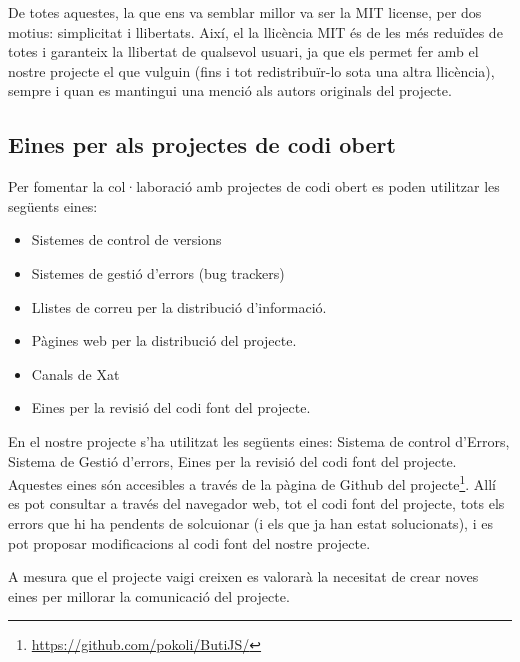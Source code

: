 De totes aquestes, la que ens va semblar millor va ser la MIT license, per dos motius: simplicitat i llibertats. Així, el la llicència MIT és de les més reduïdes de totes i garanteix la llibertat de qualsevol usuari, ja que els permet fer amb el nostre projecte el que vulguin (fins i tot redistribuïr-lo sota una altra llicència), sempre i quan es mantingui una menció als autors originals del projecte. 

\subsection{Eines per als projectes de codi obert}

Per fomentar la col·laboració amb projectes de codi obert es poden utilitzar les següents eines: 

\begin{itemize}
\item{Sistemes de control de versions}
\item{Sistemes de gestió d'errors (bug trackers)}
\item{Llistes de correu per la distribució d'informació.}
\item{Pàgines web per la distribució del projecte.}
\item{Canals de Xat}
\item{Eines per la revisió del codi font del projecte.}
\end{itemize}

En el nostre projecte s'ha utilitzat les següents eines: Sistema de control d'Errors, Sistema de Gestió d'errors, Eines per la revisió del codi font del projecte. Aquestes eines són accesibles a través de la pàgina de Github del projecte\footnote{\url{https://github.com/pokoli/ButiJS/}}. Allí es pot consultar a través del navegador web, tot el codi font del projecte, tots els errors que hi ha pendents de solcuionar (i els que ja han estat solucionats), i es pot proposar modificacions al codi font del nostre projecte. 

A mesura que el projecte vaigi creixen es valorarà la necesitat de crear noves eines per millorar la comunicació del projecte. 


